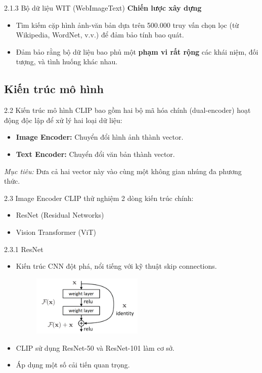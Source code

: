 \begin{frame}{2.1.3 Bộ dữ liệu WIT (WebImageText)}
\textbf{Chiến lược xây dựng}
\begin{itemize}
    \item Tìm kiếm cặp hình ảnh-văn bản dựa trên 500.000 truy vấn chọn lọc (từ Wikipedia, WordNet, v.v.) để đảm bảo tính bao quát.
    \item Đảm bảo rằng bộ dữ liệu bao phủ một \textbf{phạm vi rất rộng} các khái niệm, đối tượng, và tình huống khác nhau.
\end{itemize}
\end{frame}

\subsection{Kiến trúc mô hình}
\begin{frame}{2.2 Kiến trúc mô hình}
    CLIP bao gồm hai bộ mã hóa chính (dual-encoder) hoạt động độc lập để xử lý hai loại dữ liệu:
    \begin{itemize}
        \item \textbf{Image Encoder:} Chuyển đổi hình ảnh thành vector.
        \item \textbf{Text Encoder:} Chuyển đổi văn bản thành vector.
    \end{itemize}

    \textit{Mục tiêu:} Đưa cả hai vector này vào cùng một không gian nhúng đa phương thức.
\end{frame}

\begin{frame}{2.3 Image Encoder}
    CLIP thử nghiệm 2 dòng kiến trúc chính:
    \begin{itemize}
        \item ResNet (Residual Networks)
        \item Vision Transformer (ViT)
    \end{itemize}
\end{frame}

\begin{frame}{2.3.1 ResNet}
\begin{itemize}
    \item Kiến trúc CNN đột phá, nổi tiếng với kỹ thuật skip connections.
    \begin{figure}[H]
        \centering
        \includegraphics[width=0.5\textwidth]{img/01-skip_connection.png}
        \label{fig:skip_connection}
    \end{figure}
    \item CLIP sử dụng ResNet-50 và ResNet-101 làm cơ sở.
    \item Áp dụng một số cải tiến quan trọng.
\end{itemize}
\end{frame}

